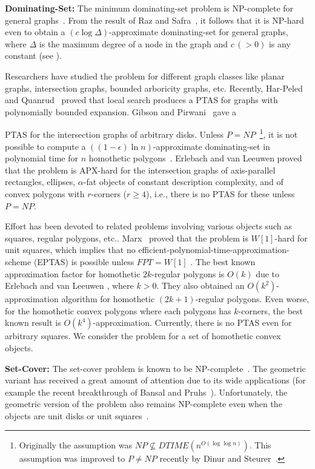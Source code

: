 \documentclass[a4paper,11pt]{article}
\begin{document}
{\bf Dominating-Set:} 
The minimum dominating-set problem is 
NP-complete for general graphs~\cite{GareyJ79}. From the result of Raz and 
Safra~\cite{RazS97}, it follows that it is NP-hard even to obtain {a} $(c\log 
\Delta)$-approximate dominating-set for general graphs, where 
$\Delta$ is the maximum degree of a node in the graph and $c\,(> 0)$ is any 
constant 
(see \cite{LenzenW10}).  


Researchers have studied the problem for different graph 
classes like planar graphs, intersection graphs, bounded arboricity graphs, etc.
Recently, Har-Peled and Quanrud~\cite{Har-PeledQ15} proved that   local search produces
 a PTAS for graphs with polynomially 
bounded expansion. 
Gibson and Pirwani~\cite{GibsonP10} gave a

PTAS for the intersection graphs of arbitrary disks.
Unless $P=NP$~\cite{DinurS14}\footnote{Originally the assumption was 
$NP\nsubseteq DTIME(n^{O(\log\log n)})$. This  assumption was improved to 
$P\neq NP$ recently by Dinur and Steurer~\cite{DinurS14}.}, it is not possible 
{to compute a} 
$((1-\epsilon)\ln n)$-approximate dominating-set  in 
polynomial time  for $n$  homothetic 
polygons~\cite{Feige98, Viggo-Kann-Thesis,Leeuwen-Thesis}.
Erlebach and van Leeuwen \cite{ErlebachL08} proved that  the problem is 
APX-hard for the 
intersection graphs of axis-parallel rectangles, ellipses,  $\alpha$-fat 
objects of constant description complexity, and of convex polygons with 
$r$-corners ($r\geq 4$),  i.e., there is no PTAS for these  unless 
$P=NP$. 


{Effort has been devoted to related problems involving various objects such as
squares, regular polygons, etc..}
Marx~\cite{Marx06} proved that the problem is $W[1]$-hard for unit 
squares, which implies that no 
efficient-polynomial-time-approximation-scheme (EPTAS) is possible unless 
$FPT=W[1]$ 
\cite{Marx08}. 
 The best known approximation factor for homothetic $2k$-regular 
polygons is $O(k)$ due to Erlebach and van Leeuwen \cite{ErlebachL08}, where 
$k>0$. They also obtained an $O(k^2)$-approximation algorithm for homothetic 
$(2k+1)$-regular polygons.
Even worse, for  the homothetic convex polygons where each 
polygons has $k$-corners, the best known result is $O(k^4)$-approximation. 
{Currently, there is no}  PTAS  even for arbitrary squares.
We consider the problem for a set of homothetic convex objects.

   
{\bf Set-Cover:}
The set-cover problem is known to be NP-complete~\cite{Karp}.
The geometric variant 
{has received a great amount of attention} due to its wide applications (for example the recent 
breakthrough of Bansal and Pruhs~\cite{BansalP14}). 
Unfortunately, the
geometric version of the problem also remains NP-complete even when the objects 
are unit disks or unit squares~\cite{ChanG, HochbaumM87}. 
\end{document}
